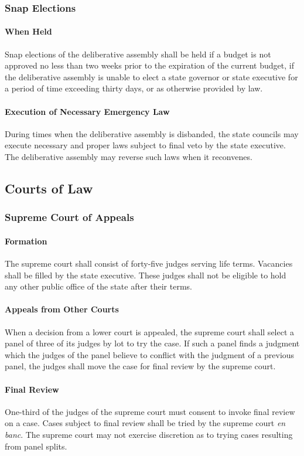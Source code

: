 \documentclass{article}
\begin{document}
\subsubsection{Snap Elections}
\paragraph{When Held}
Snap elections of the deliberative assembly shall be held if a budget is not approved no less than two weeks prior to the expiration of the current budget, if the deliberative assembly is unable to elect a state governor or state executive for a period of time exceeding thirty days, or as otherwise provided by law.
\paragraph{Execution of Necessary Emergency Law}
During times when the deliberative assembly is disbanded, the state councils may execute necessary and proper laws subject to final veto by the state executive. The deliberative assembly may reverse such laws when it reconvenes.
\newpage
\subsection{Courts of Law}
\subsubsection{Supreme Court of Appeals}
\paragraph{Formation}
The supreme court shall consist of forty-five judges serving life terms. Vacancies shall be filled by the state executive. These judges shall not be eligible to hold any other public office of the state after their terms.
\paragraph{Appeals from Other Courts}
When a decision from a lower court is appealed, the supreme court shall select a panel of three of its judges by lot to try the case. If such a panel finds a judgment which the judges of the panel believe to conflict with the judgment of a previous panel, the judges shall move the case for final review by the supreme court.
\paragraph{Final Review}
One-third of the judges of the supreme court must consent to invoke final review on a case. Cases subject to final review shall be tried by the supreme court \textit{en banc}. The supreme court may not exercise discretion as to trying cases resulting from panel splits.
\end{document}
